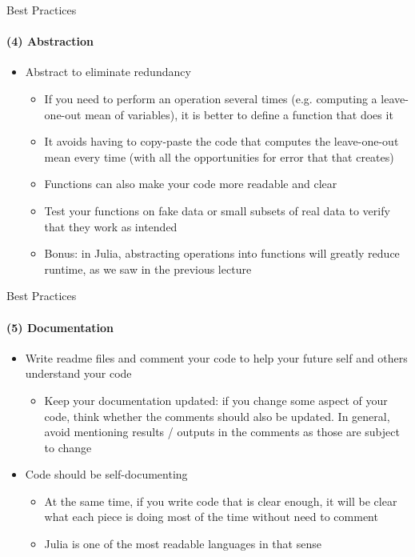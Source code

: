 \documentclass[10pt, aspectratio=169, xcolor=dvipsnames]{beamer}
\let\olditem\item
\renewcommand{\item}{%
\olditem\vspace{0.3em}}
\begin{document}
\begin{frame}[t]{Best Practices}
    \framesubtitle{(4) Abstraction}

    \normalsize\vspace{0.5em} \begin{itemize}
        \item Abstract to eliminate redundancy \begin{itemize}
            \item If you need to perform an operation several times (e.g. computing a leave-one-out mean of variables), it is better to define a function that does it 
            \item It avoids having to copy-paste the code that computes the leave-one-out mean every time (with all the opportunities for error that that creates)
            \item Functions can also make your code more readable and clear
            \item Test your functions on fake data or small subsets of real data to verify that they work as intended
            \item Bonus: in Julia, abstracting operations into functions will greatly reduce runtime, as we saw in the previous lecture
        \end{itemize}
    \end{itemize}
\end{frame}

\begin{frame}[t]{Best Practices}
    \framesubtitle{(5) Documentation}

    \normalsize\vspace{0.5em} \begin{itemize}
        \item Write readme files and comment your code to help your future self and others understand your code \begin{itemize}
            \item Keep your documentation updated: if you change some aspect of your code, think whether the comments should also be updated. In general, avoid mentioning results / outputs in the comments as those are subject to change
        \end{itemize}
        \item Code should be self-documenting \begin{itemize}
            \item At the same time, if you write code that is clear enough, it will be clear what each piece is doing most of the time without need to comment
            \item Julia is one of the most readable languages in that sense
        \end{itemize}
    \end{itemize}
\end{frame}
\end{document}
